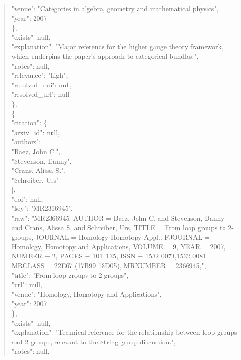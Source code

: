\documentclass[11pt]{article}
\begin{document}
\begin{quote}
        "venue": "Categories in algebra, geometry and mathematical physics",\\
        "year": 2007\\
      \},\\
      "exists": null,\\
      "explanation": "Major reference for the higher gauge theory framework, which underpins the paper's approach to categorical bundles.",\\
      "notes": null,\\
      "relevance": "high",\\
      "resolved\_doi": null,\\
      "resolved\_url": null\\
    \},\\
    \{\\
      "citation": \{\\
        "arxiv\_id": null,\\
        "authors": [\\
          "Baez, John C.",\\
          "Stevenson, Danny",\\
          "Crans, Alissa S.",\\
          "Schreiber, Urs"\\
        ],\\
        "doi": null,\\
        "key": "MR2366945",\\
        "raw": "MR2366945: AUTHOR = Baez, John C. and Stevenson, Danny and Crans, Alissa S. and Schreiber, Urs, TITLE = From loop groups to 2-groups, JOURNAL = Homology Homotopy Appl., FJOURNAL = Homology, Homotopy and Applications, VOLUME = 9, YEAR = 2007, NUMBER = 2, PAGES = 101--135, ISSN = 1532-0073,1532-0081, MRCLASS = 22E67 (17B99 18D05), MRNUMBER = 2366945,",\\
        "title": "From loop groups to 2-groups",\\
        "url": null,\\
        "venue": "Homology, Homotopy and Applications",\\
        "year": 2007\\
      \},\\
      "exists": null,\\
      "explanation": "Technical reference for the relationship between loop groups and 2-groups, relevant to the String group discussion.",\\
      "notes": null,\\

\end{quote}
\end{document}
